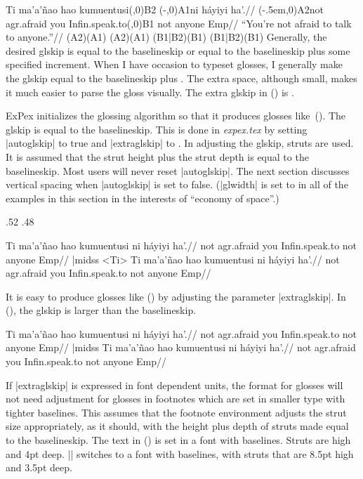 \begingl[extraglskip=1.2ex]
\gla Ti ma'a'\~nao hao kumuentusi\pnode(\lingdima,0){B2} \pnode(-\lingdima,0){A1}ni h\'ayiyi ha'.//
\glb \pnode(-.5em,0){A2}not agr.afraid you
Infin.speak.to\pnode(\lingdima,0){B1} not anyone Emp//
\glft ``You're not afraid to talk to anyone.''//
\endgl
\pcline{|*-|*}(A2)(A1)
\pcline{<->}(A2)(A1)
\pcline{|*-|*}(B1|B2)(B1)
\pcline{<->}(B1|B2)(B1)
\xe
Generally, the desired glskip is equal to the baselineskip or
equal to the baselineskip plus some specified increment.  When I
have occasion to typeset glosses, I generally make the glskip
equal to the baselineskip plus \textdim{.6 ex}.  The extra space,
although small, makes it much easier to parse the gloss visually.
The extra glskip in (\lastx) is \textdim{1.2 ex}.

ExPex initializes the glossing algorithm so that it produces
glosses like~(\nextx). The glskip is equal to the baselineskip.
This is done in {\it expex.tex\/} by setting |autoglskip| to true
and |extraglskip| to \textdim{0 pt}. In adjusting the glskip,
struts are used.  It is assumed that the strut height plus the
strut depth is equal to the baselineskip. Most users will never
reset |autoglskip|.  The next section discusses vertical spacing
when |autoglskip| is set to false. (|glwidth| is set to
\textdim{2.4 in} in all of the examples in this section in the
interests of ``economy of space''.)

\setss .52 .48

\beginss
\ex
\begingl
\gla Ti ma'a'\~nao hao kumuentusi
   ni h\'ayiyi ha'.//
\glb not agr.afraid you
   Infin.speak.to not anyone Emp//
\endgl
\xe|midss
\ex<Ti>
\begingl
\gla Ti ma'a'\~nao hao kumuentusi ni h\'ayiyi ha'.//
\glb not agr.afraid you Infin.speak.to not anyone Emp//
\endgl
\xe
\endss

It is easy to produce glosses like (\nextx) by adjusting the
parameter |extraglskip|.  In (\nextx), the glskip is \textdim{1.2
ex} larger than the baselineskip.

\beginss
\ex
\begingl[extraglskip=1.2ex]
\gla Ti ma'a'\~nao hao kumuentusi
   ni h\'ayiyi ha'.//
\glb not agr.afraid you
   Infin.speak.to not anyone Emp//
\endgl
\xe|midss
\ex
\begingl[extraglskip=1.2ex]
\gla Ti ma'a'\~nao hao kumuentusi ni h\'ayiyi ha'.//
\glb not agr.afraid you Infin.speak.to not anyone Emp//
\endgl
\xe
\endss

If |extraglskip| is expressed in font dependent units, the format
for glosses will not need adjustment for glosses in footnotes
which are set in smaller type with tighter baselines. This
assumes that the footnote environment adjusts the strut size
appropriately, as it should, with the height plus depth of struts
made equal to the baselineskip. The text in (\nextx) is set in a
\textdim{12 pt} font with \textdim{14 pt} baselines.  Struts are
\textdim{10 pt} high and 4pt deep. |\fnenvironment| switches to a
\textdim{10 pt} font with \textdim{12 pt} baselines, with struts
that are 8.5pt high and 3.5pt deep.

